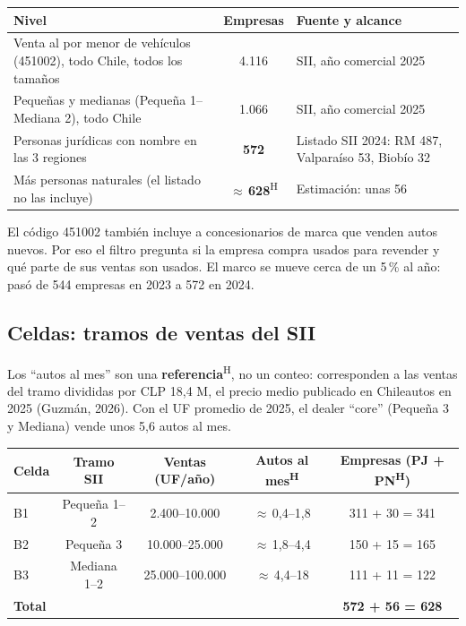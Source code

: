 \documentclass[11pt,a4paper]{article}
\newcommand{\hyp}{\textsuperscript{\textsf{\scriptsize H}}}
\begin{document}
\begin{center}\small
\begin{tabularx}{\textwidth}{@{}Lcp{4.6cm}@{}}
\toprule
\textbf{Nivel} & \textbf{Empresas} & \textbf{Fuente y alcance}\\
\midrule
Venta al por menor de vehículos (451002), todo Chile, todos los tamaños & 4.116 & SII, año comercial 2025 \\
Pequeñas y medianas (Pequeña 1–Mediana 2), todo Chile & 1.066 & SII, año comercial 2025 \\
Personas jurídicas con nombre en las 3 regiones & \textbf{572} & Listado SII 2024: RM 487, Valparaíso 53, Biobío 32 \\
Más personas naturales (el listado no las incluye) & $\approx$\,\textbf{628}\hyp & Estimación: unas 56 \\
\bottomrule
\end{tabularx}
\end{center}

El código 451002 también incluye a concesionarios de marca que venden autos nuevos. Por eso el filtro pregunta si la empresa compra usados para revender y qué parte de sus ventas son usados. El marco se mueve cerca de un 5\,\% al año: pasó de 544 empresas en 2023 a 572 en 2024.

\subsection{Celdas: tramos de ventas del SII}
Los \enquote{autos al mes} son una \textbf{referencia}\hyp, no un conteo: corresponden a las ventas del tramo divididas por CLP 18,4 M, el precio medio publicado en Chileautos en 2025 (Guzmán, 2026). Con el UF promedio de 2025, el dealer \enquote{core} (Pequeña 3 y Mediana) vende unos 5,6 autos al mes.

\begin{center}\small
\begin{tabularx}{\textwidth}{@{}lCCCC@{}}
\toprule
\textbf{Celda} & \textbf{Tramo SII} & \textbf{Ventas (UF/año)} & \textbf{Autos al mes\hyp} & \textbf{Empresas (PJ + PN\hyp)}\\
\midrule
B1 & Pequeña 1–2 & 2.400–10.000 & $\approx$\,0,4–1,8 & 311 + 30 = 341\\
B2 & Pequeña 3 & 10.000–25.000 & $\approx$\,1,8–4,4 & 150 + 15 = 165\\
B3 & Mediana 1–2 & 25.000–100.000 & $\approx$\,4,4–18 & 111 + 11 = 122\\
\midrule
\textbf{Total} & & & & \textbf{572 + 56 = 628}\\
\bottomrule
\end{tabularx}
\end{center}
\end{document}
